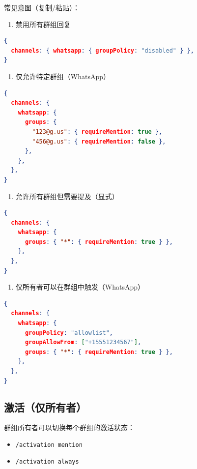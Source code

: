 常见意图（复制/粘贴）：

\begin{enumerate}
  \item 禁用所有群组回复
\end{enumerate}


\begin{lstlisting}[language=json]
{
  channels: { whatsapp: { groupPolicy: "disabled" } },
}
\end{lstlisting}


\begin{enumerate}
  \item 仅允许特定群组（WhatsApp）
\end{enumerate}


\begin{lstlisting}[language=json]
{
  channels: {
    whatsapp: {
      groups: {
        "123@g.us": { requireMention: true },
        "456@g.us": { requireMention: false },
      },
    },
  },
}
\end{lstlisting}


\begin{enumerate}
  \item 允许所有群组但需要提及（显式）
\end{enumerate}


\begin{lstlisting}[language=json]
{
  channels: {
    whatsapp: {
      groups: { "*": { requireMention: true } },
    },
  },
}
\end{lstlisting}


\begin{enumerate}
  \item 仅所有者可以在群组中触发（WhatsApp）
\end{enumerate}


\begin{lstlisting}[language=json]
{
  channels: {
    whatsapp: {
      groupPolicy: "allowlist",
      groupAllowFrom: ["+15551234567"],
      groups: { "*": { requireMention: true } },
    },
  },
}
\end{lstlisting}


\subsection{激活（仅所有者）}


群组所有者可以切换每个群组的激活状态：

\begin{itemize}
  \item \texttt{/activation mention}
  \item \texttt{/activation always}
\end{itemize}


